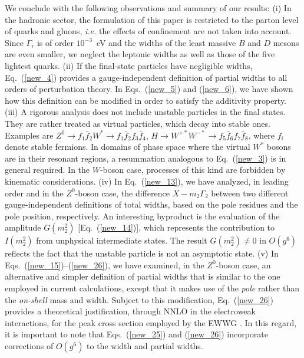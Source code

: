 \documentclass[a4paper,12pt]{article}
\begin{document}
We conclude with the following observations and summary of our results:
(i) In the hadronic sector, the formulation of this paper is restricted to
the parton level of quarks and gluons, {\it i.e.} the effects of confinement
are not taken into account.
Since $\Gamma_\tau$ is of order $10^{-3}$~eV and the widths of the least
massive $B$ and $D$ mesons are even smaller, we neglect the leptonic widths as
well as those of the five lightest quarks.
(ii) If the final-state particles  have negligible widths, Eq.~(\ref{new_4})
provides a gauge-independent definition of partial widths to all orders of
perturbation theory.
In Eqs.~(\ref{new_5}) and (\ref{new_6}), we have shown how this definition
can be modified in order to satisfy the additivity property.
(iii) A rigorous analysis does not include unstable particles in the final
states.
They are rather treated as virtual particles, which decay into stable ones. 
Examples are $Z^0\to f_1\bar f_2W^*\to f_1\bar f_2f_3\bar f_4$,
$H\to W^{+*}W^{-*}\to f_5\bar f_6 f_7 \bar f_8$, where $f_i$ denote stable
fermions.
In domains of phase space where the virtual $W^*$ bosons are in their resonant
regions, a resummation analogous to Eq.~(\ref{new_3}) is in general required. 
In the $W$-boson case, processes of this kind are forbidden by kinematic
considerations.
(iv) In Eq.~(\ref{new_13}), we have analyzed, in leading order and in the
$Z^0$-boson case, the difference $X-m_2\Gamma_2$ between two different
gauge-independent definitions of total widths, based on the pole residues and
the pole position, respectively.
An interesting byproduct is the evaluation of the amplitude
$G\left(m^2_2\right)$ [Eq.~(\ref{new_14})], which represents the contribution
to $I\left(m^2_2\right)$ from unphysical intermediate states.
The result $G\left(m^2_2\right)\neq0$ in $O(g^6)$ reflects the fact that the
unstable particle is not an asymptotic state.
(v) In Eqs.~(\ref{new_15})--(\ref{new_26}), we have examined, in the
$Z^0$-boson case, an alternative and simpler definition of partial widths that
is similar to the one employed in current calculations, except that it
makes use of the {\it pole} rather than the {\it on-shell} mass and width.
Subject to this modification, Eq.~(\ref{new_26}) provides a theoretical
justification, through NNLO in the electroweak interactions, 
for the peak cross section employed by the EWWG \cite{ewwg}.
In this regard, it is important to note that Eqs.~(\ref{new_25}) and
(\ref{new_26}) incorporate corrections of $O(g^6)$ to the width and partial
widths. 
\end{document}
